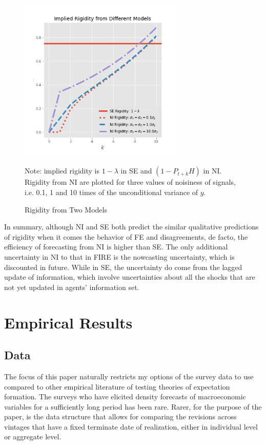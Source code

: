 \documentclass[12pt]{article}
\begin{document}
	
	\begin{figure}[ht]
		\centering
		\includegraphics[width=0.7\textwidth]{figures/rigidity.png} 
		\begin{flushleft}
			{\footnotesize Note: implied rigidity is $1-\lambda$ in SE and $(1-P_{t+k}H)$ in NI. Rigidity from NI are plotted for three values of noisiness of signals, i.e. 0.1, 1 and 10 times of the unconditional variance of $y$. }
		\end{flushleft}
		\caption{Rigidity from Two Models}
		\label{rigidity}
	\end{figure}
	
	In summary, although NI and SE both predict the similar qualitative predictions of rigidity when it comes the behavior of FE and disagreements, de facto, the efficiency of forecasting from NI is higher than SE. The only additional uncertainty in NI to that in FIRE is the nowcasting uncertainty, which is discounted in future. While in SE, the uncertainty do come from the lagged update of information, which involve uncertainties about all the shocks that are not yet updated in agents' information set. 
	
	\section{Empirical Results}\label{empirical}
	
	\subsection{Data}
	
	The focus of this paper naturally restricts my options of the survey data to use compared to other empirical  literature of testing theories of expectation formation.  The surveys who have elicited density forecasts of macroeconomic variables for a sufficiently long period has been rare. Rarer, for the purpose of the paper, is the data structure that allows for comparing the revisions across vintages that have a fixed terminate date of realization, either in individual level or aggregate level. 
	
\end{document}
